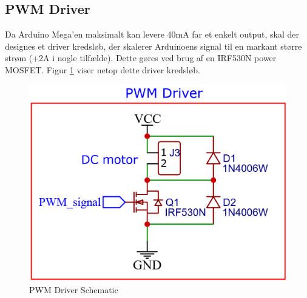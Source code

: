\documentclass[../main.tex]{subfiles}
\begin{document}
\subsection{PWM Driver}
Da Arduino Mega'en maksimalt kan levere 40mA far et enkelt output, skal der designes et driver kredsløb, der skalerer Arduinoens signal til en markant større strøm (+2A i nogle tilfælde). Dette gøres ved brug af en IRF530N power MOSFET. Figur \ref{fig: PWM Driver Schematic} viser netop dette driver kredsløb.
\begin{figure}[h]
      \includegraphics[width=\textwidth]{Dokumentation/Figures/PWM_Driver.png}
     \caption{PWM Driver Schematic}
     \label{fig: PWM Driver Schematic}
\end{figure}
\end{document}

